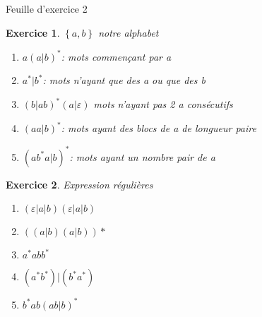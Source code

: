 \documentclass{article}
\theoremstyle{plain}
\newtheorem{exo}{Exercice}%
\begin{document}
\begin{center}
\large\sc Feuille d'exercice 2
\end{center}

\begin{exo} $\left\{a, b\right\}$ notre alphabet
\begin{enumerate}
    \item $a{(a|b)}^*$: mots commençant par a
    \item $a^*|b^*$: mots n'ayant que des a ou que des b
    \item ${(b|ab)}^*(a|\varepsilon)$ mots n'ayant pas 2 a consécutifs
    \item ${(aa|b)}^*$: mots ayant des blocs de a de longueur paire
    \item ${(ab^*a|b)}^*$: mots ayant un nombre pair de a
\end{enumerate}
\end{exo}

\begin{exo} Expression régulières
\begin{enumerate} 
    \item $(\varepsilon|a|b)(\varepsilon|a|b)$
    \item $((a|b)(a|b))*$
    \item $a^*abb^*$
    \item $(a^*b^*)|(b^*a^*)$
    \item $b^*ab{(ab|b)}^*$
\end{enumerate}
\end{exo}
\end{document}
